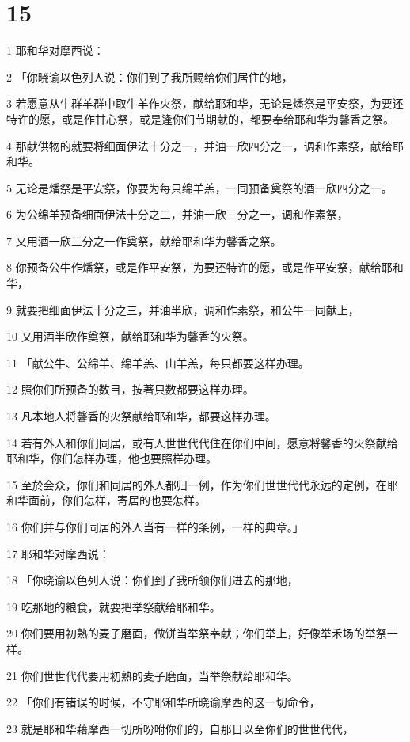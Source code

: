 \chapter{15}

\par 1 耶和华对摩西说：
\par 2 「你晓谕以色列人说：你们到了我所赐给你们居住的地，
\par 3 若愿意从牛群羊群中取牛羊作火祭，献给耶和华，无论是燔祭是平安祭，为要还特许的愿，或是作甘心祭，或是逢你们节期献的，都要奉给耶和华为馨香之祭。
\par 4 那献供物的就要将细面伊法十分之一，并油一欣四分之一，调和作素祭，献给耶和华。
\par 5 无论是燔祭是平安祭，你要为每只绵羊羔，一同预备奠祭的酒一欣四分之一。
\par 6 为公绵羊预备细面伊法十分之二，并油一欣三分之一，调和作素祭，
\par 7 又用酒一欣三分之一作奠祭，献给耶和华为馨香之祭。
\par 8 你预备公牛作燔祭，或是作平安祭，为要还特许的愿，或是作平安祭，献给耶和华，
\par 9 就要把细面伊法十分之三，并油半欣，调和作素祭，和公牛一同献上，
\par 10 又用酒半欣作奠祭，献给耶和华为馨香的火祭。
\par 11 「献公牛、公绵羊、绵羊羔、山羊羔，每只都要这样办理。
\par 12 照你们所预备的数目，按著只数都要这样办理。
\par 13 凡本地人将馨香的火祭献给耶和华，都要这样办理。
\par 14 若有外人和你们同居，或有人世世代代住在你们中间，愿意将馨香的火祭献给耶和华，你们怎样办理，他也要照样办理。
\par 15 至於会众，你们和同居的外人都归一例，作为你们世世代代永远的定例，在耶和华面前，你们怎样，寄居的也要怎样。
\par 16 你们并与你们同居的外人当有一样的条例，一样的典章。」
\par 17 耶和华对摩西说：
\par 18 「你晓谕以色列人说：你们到了我所领你们进去的那地，
\par 19 吃那地的粮食，就要把举祭献给耶和华。
\par 20 你们要用初熟的麦子磨面，做饼当举祭奉献；你们举上，好像举禾场的举祭一样。
\par 21 你们世世代代要用初熟的麦子磨面，当举祭献给耶和华。
\par 22 「你们有错误的时候，不守耶和华所晓谕摩西的这一切命令，
\par 23 就是耶和华藉摩西一切所吩咐你们的，自那日以至你们的世世代代，
